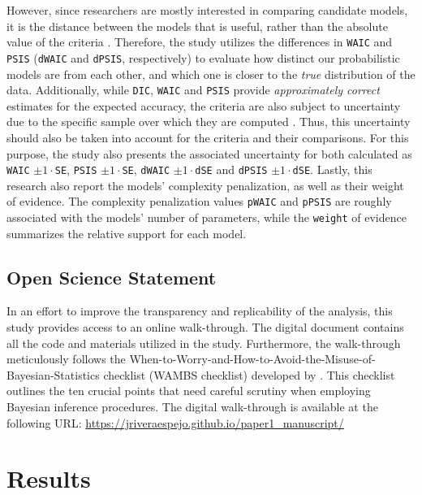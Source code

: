 \documentclass[
  authoryear,
  preprint,
  1p]{elsarticle}
\begin{document}
{However, since researchers are mostly interested in comparing candidate
models, it is the distance between the models that is useful, rather
than the absolute value of the criteria
\citep[see][209, 223-224]{McElreath_2020}. Therefore, the study utilizes
the differences in \texttt{WAIC} and \texttt{PSIS} (\texttt{dWAIC} and
\texttt{dPSIS}, respectively) to evaluate how distinct our probabilistic
models are from each other, and which one is closer to the \emph{true}
distribution of the data. Additionally, while \texttt{DIC},
\texttt{WAIC} and \texttt{PSIS} provide \emph{approximately correct}
estimates for the expected accuracy, the criteria are also subject to
uncertainty due to the specific sample over which they are computed
\citep[see][223]{McElreath_2020}. Thus, this uncertainty should also be
taken into account for the criteria and their comparisons. For this
purpose, the study also presents the associated uncertainty for both
calculated as \texttt{WAIC} \(\pm 1 \cdot\)\texttt{SE}, \texttt{PSIS}
\(\pm 1 \cdot\)\texttt{SE}, \texttt{dWAIC} \(\pm 1 \cdot\)\texttt{dSE}
and \texttt{dPSIS} \(\pm 1 \cdot\)\texttt{dSE}. Lastly, this research
also report the models' complexity penalization, as well as their weight
of evidence. The complexity penalization values \texttt{pWAIC} and
\texttt{pPSIS} are roughly associated with the models' number of
parameters, while the \texttt{weight} of evidence summarizes the
relative support for each model.}

\subsection{Open Science Statement}\label{sec-M-SM-OS}

In an effort to improve the transparency and replicability of the
analysis, this study provides access to an online walk-through. The
digital document contains all the code and materials utilized in the
study. Furthermore, the walk-through meticulously follows the
When-to-Worry-and-How-to-Avoid-the-Misuse-of-Bayesian-Statistics
checklist (WAMBS checklist) developed by \citet{Depaoli_et_al_2017}.
This checklist outlines the ten crucial points that need careful
scrutiny when employing Bayesian inference procedures. {The digital
walk-through is available at the following URL}:
\url{https://jriveraespejo.github.io/paper1_manuscript/}

\section{Results}\label{sec-results}
\end{document}
